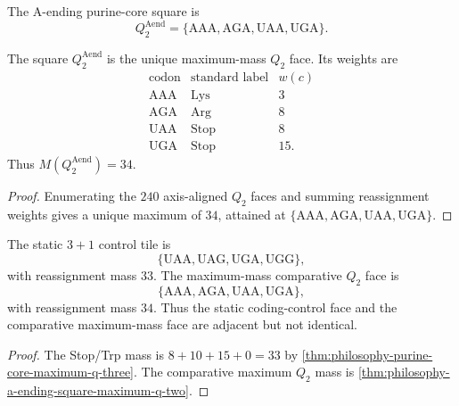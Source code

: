 \begin{definition}
\label{def:philosophy-a-ending-purine-core-square}
The A-ending purine-core square is
$$
  Q_{2}^{\mathrm{Aend}}
  =
  \{\mathrm{AAA},\mathrm{AGA},\mathrm{UAA},\mathrm{UGA}\}.
$$
\end{definition}

\begin{theorem}
\label{thm:philosophy-a-ending-square-maximum-q-two}
The square $Q_{2}^{\mathrm{Aend}}$ is the unique maximum-mass $Q_{2}$
face. Its weights are
$$
\begin{array}{c|c|r}
  \text{codon} & \text{standard label} & w(c)\\
\hline
  \mathrm{AAA} & \mathrm{Lys} & 3\\
  \mathrm{AGA} & \mathrm{Arg} & 8\\
  \mathrm{UAA} & \mathrm{Stop} & 8\\
  \mathrm{UGA} & \mathrm{Stop} & 15.
\end{array}
$$
Thus $M(Q_{2}^{\mathrm{Aend}})=34$.
\end{theorem}
\begin{proof}
Enumerating the $240$ axis-aligned $Q_{2}$ faces and summing
reassignment weights gives a unique maximum of $34$, attained at
$\{\mathrm{AAA},\mathrm{AGA},\mathrm{UAA},\mathrm{UGA}\}$.
\end{proof}

\begin{corollary}
\label{cor:philosophy-static-comparative-faces-differ}
The static $3+1$ control tile is
$$
  \{\mathrm{UAA},\mathrm{UAG},\mathrm{UGA},\mathrm{UGG}\},
$$
with reassignment mass $33$. The maximum-mass comparative $Q_{2}$ face
is
$$
  \{\mathrm{AAA},\mathrm{AGA},\mathrm{UAA},\mathrm{UGA}\},
$$
with reassignment mass $34$. Thus the static coding-control face and the
comparative maximum-mass face are adjacent but not identical.
\end{corollary}
\begin{proof}
The Stop/Trp mass is $8+10+15+0=33$ by
\autoref{thm:philosophy-purine-core-maximum-q-three}. The comparative
maximum $Q_{2}$ mass is
\autoref{thm:philosophy-a-ending-square-maximum-q-two}.
\end{proof}

